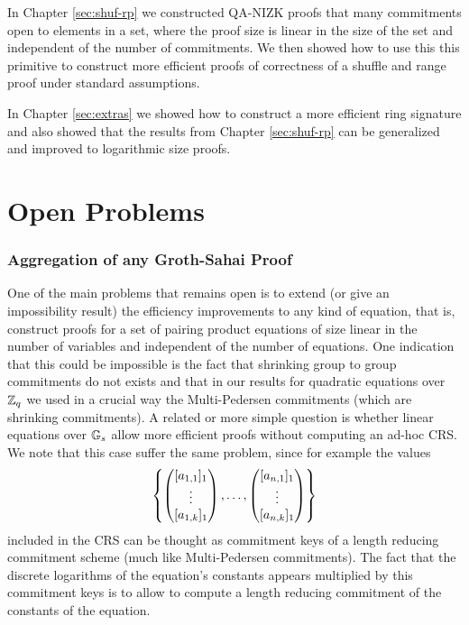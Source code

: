 In Chapter \ref{sec:shuf-rp} we constructed QA-NIZK proofs that many commitments open to elements in a set, where the proof size is linear in the size of the set and independent of the number of commitments. We then showed how to use this this primitive to construct more efficient proofs of correctness of a shuffle and range proof under standard assumptions.

In Chapter \ref{sec:extras} we showed how to construct a more efficient ring signature and also showed that the results from Chapter \ref{sec:shuf-rp} can be generalized and improved to logarithmic size proofs.

\iffalse
\section{Open Problems}

\subsubsection{Aggregation of any Groth-Sahai Proof}
One of the main problems that remains open is to extend (or give an impossibility result) the efficiency improvements to any kind of equation, that is, construct proofs for a set of pairing product equations of size linear in the number of variables and independent of the number of equations. One indication that this could be impossible is the fact that shrinking group to group commitments do not exists \cite{EC:AbeHarOhk12} and that in our results for quadratic equations over $\mathbb{Z}_q$ we used in a crucial way the Multi-Pedersen commitments (which are shrinking commitments). A related or more simple question is whether linear equations over $\mathbb{G}_s$ allow more efficient proofs without computing an ad-hoc CRS. We note that this case suffer the same problem, since for example the values 
$$\left\{\left(\begin{matrix}{[a_{1,1}]_1}\\\vdots\\{[a_{1,k}]_1}\end{matrix}\right),\ldots,\left(\begin{matrix}{[a_{n,1}]_1}\\\vdots\\{[a_{n,k}]_1}\end{matrix}\right)\right\}$$
included in the CRS can be thought as commitment keys of a length reducing commitment scheme (much like Multi-Pedersen commitments). The fact that the discrete logarithms of the equation's constants appears multiplied by this commitment keys is to allow to compute a length reducing commitment of the constants of the equation.

